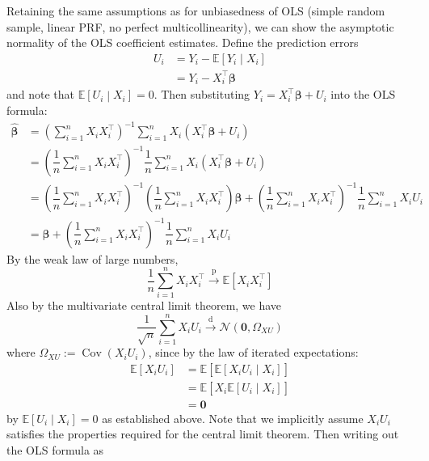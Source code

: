 \documentclass[11pt]{report} %
\begin{document}
Retaining the same assumptions as for unbiasedness of OLS (simple random sample, linear PRF, no perfect multicollinearity), we can show the asymptotic normality of the OLS coefficient estimates. Define the prediction errors
\begin{align}
U_{i} &= Y_{i} - \mathbb{E}\left[Y_{i}\middle| X_{i}\right] \\
&= Y_{i} - X_{i}^{\top}\boldsymbol{\beta}
\end{align}
and note that $\mathbb{E}\left[U_{i}\middle| X_{i}\right] = 0$. Then substituting $Y_{i} = X_{i}^{\top}\boldsymbol{\beta} + U_{i}$ into the OLS formula:
\begin{align}
\widehat{\boldsymbol{\beta}} &= \left(\sum_{i=1}^{n}X_{i}X_{i}^{\top}\right)^{-1}\sum_{i=1}^{n}X_{i}\left(X_{i}^{\top}\boldsymbol{\beta}+U_{i}\right) \\
&= \left(\dfrac{1}{n}\sum_{i=1}^{n}X_{i}X_{i}^{\top}\right)^{-1}\dfrac{1}{n}\sum_{i=1}^{n}X_{i}\left(X_{i}^{\top}\boldsymbol{\beta}+U_{i}\right) \\
&= \left(\dfrac{1}{n}\sum_{i=1}^{n}X_{i}X_{i}^{\top}\right)^{-1}\left(\dfrac{1}{n}\sum_{i=1}^{n}X_{i}X_{i}^{\top}\right)\boldsymbol{\beta}+\left(\dfrac{1}{n}\sum_{i=1}^{n}X_{i}X_{i}^{\top}\right)^{-1}\dfrac{1}{n}\sum_{i=1}^{n}X_{i}U_{i} \\
&= \boldsymbol{\beta}+\left(\dfrac{1}{n}\sum_{i=1}^{n}X_{i}X_{i}^{\top}\right)^{-1}\dfrac{1}{n}\sum_{i=1}^{n}X_{i}U_{i}
\end{align}
By the weak law of large numbers,
\begin{equation}
\dfrac{1}{n}\sum_{i=1}^{n}X_{i}X_{i}^{\top} \overset{\mathrm{p}}{\to} \mathbb{E}\left[X_{i}X_{i}^{\top}\right]
\end{equation}
Also by the multivariate central limit theorem, we have
\begin{equation}
\dfrac{1}{\sqrt{n}}\sum_{i = 1}^{n}X_{i}U_{i} \overset{\mathrm{d}}{\to} \mathcal{N}\left(\mathbf{0}, \Omega_{XU}\right)
\end{equation}
where $\Omega_{XU} := \operatorname{Cov}\left(X_{i}U_{i}\right)$, since by the law of iterated expectations:
\begin{align}
\mathbb{E}\left[X_{i}U_{i}\right] &= \mathbb{E}\left[\mathbb{E}\left[X_{i}U_{i}\middle| X_{i}\right]\right] \\
&= \mathbb{E}\left[X_{i}\mathbb{E}\left[U_{i}\middle| X_{i}\right]\right] \\
&= \mathbf{0}
\end{align}
by $\mathbb{E}\left[U_{i}\middle| X_{i}\right] = 0$ as established above. Note that we implicitly assume $X_{i}U_{i}$ satisfies the properties required for the central limit theorem. Then writing out the OLS formula as
\end{document}
